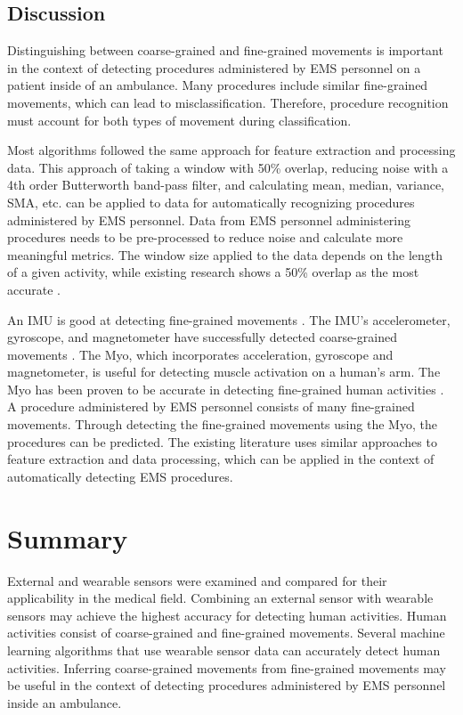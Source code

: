\subsection{Discussion}
Distinguishing between coarse-grained and fine-grained movements is important in the context of detecting procedures administered by EMS personnel on a patient inside of an ambulance. Many procedures include similar fine-grained movements, which can lead to misclassification. Therefore, procedure recognition must account for both types of movement during classification.
\par Most algorithms followed the same approach for feature extraction and processing data. This approach of taking a window with 50\% overlap, reducing noise with a 4th order Butterworth band-pass filter, and calculating mean, median, variance, SMA, etc. can be applied to data for automatically recognizing procedures administered by EMS personnel. Data from EMS personnel administering procedures needs to be pre-processed to reduce noise and calculate more meaningful metrics. The window size applied to the data depends on the length of a given activity, while existing research shows a 50\% overlap as the most accurate \cite{Wannenburg2016}.
\par An IMU is good at detecting fine-grained movements \cite{Parate2014}. The IMU's accelerometer, gyroscope, and magnetometer have successfully detected coarse-grained movements \cite{Zhang2013}. The Myo, which incorporates acceleration, gyroscope and magnetometer, is useful for detecting muscle activation on a human's arm. The Myo has been proven to be accurate in detecting fine-grained human activities \cite{Benalcazar2017}. A procedure administered by EMS personnel consists of many fine-grained movements. Through detecting the fine-grained movements using the Myo, the procedures can be predicted. The existing literature uses similar approaches to feature extraction and data processing, which can be applied in the context of automatically detecting EMS procedures.

\section{Summary}
\label{sec:Literature-Review:Summary}
External and wearable sensors were examined and compared for their applicability in the medical field. Combining an external sensor with wearable sensors may achieve the highest accuracy for detecting human activities. Human activities consist of coarse-grained and fine-grained movements. Several machine learning algorithms that use wearable sensor data can accurately detect human activities. Inferring coarse-grained movements from fine-grained movements may be useful in the context of detecting procedures administered by EMS personnel inside an ambulance. 